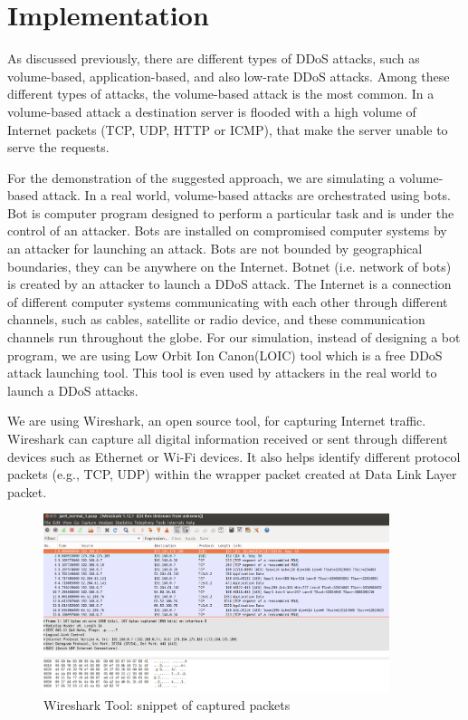 \documentclass[12pt,oneside,a4paper]{article}
\begin{document}
\pagebreak

\section{Implementation} \label{sec:Implementation}

As discussed previously, there are different types of DDoS attacks, such as volume-based, application-based, and also low-rate DDoS attacks. Among these different types of attacks, the volume-based attack is the most common. In a volume-based attack a destination server is flooded with a high volume of Internet packets (TCP, UDP, HTTP or ICMP), that make the server unable to serve the requests.

For the demonstration of the suggested approach, we are simulating a volume-based attack. In a real world, volume-based attacks are orchestrated using bots. Bot\cite{bot} is computer program designed to perform a particular task and is under the control of an attacker. Bots are installed on compromised computer systems by an attacker for launching an attack. Bots are not bounded by geographical boundaries, they can be anywhere on the Internet. Botnet (i.e. network of bots) is created by an attacker to launch a DDoS attack. The Internet is a connection of different computer systems communicating with each other through different channels, such as cables, satellite or radio device, and these communication channels run throughout the globe. For our simulation, instead of designing a bot program, we are using Low Orbit Ion Canon(LOIC) tool which is a free DDoS attack launching tool. This tool is even used by attackers in the real world to launch a DDoS attacks.

We are using Wireshark, an open source tool, for capturing Internet traffic. Wireshark can capture all digital information received or sent through different devices such as Ethernet or Wi-Fi devices. It also helps identify different protocol packets (e.g., TCP, UDP) within the wrapper packet created at Data Link Layer packet.\par

\begin{figure}[H]
\centering
\includegraphics[width=0.90\textwidth]{Wireshark_Tools.png}
\caption{Wireshark Tool: snippet of captured packets} \label{fig:wireshark}
\end{figure}
\end{document}
